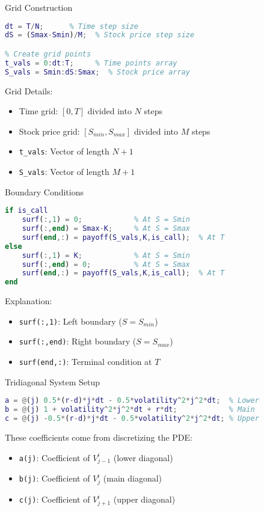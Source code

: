 \documentclass{beamer}
\begin{document}
\begin{frame}[fragile]{Grid Construction}
    \begin{lstlisting}[language=Matlab]
% Determine step sizes
dt = T/N;      % Time step size
dS = (Smax-Smin)/M;  % Stock price step size

% Create grid points
t_vals = 0:dt:T;     % Time points array
S_vals = Smin:dS:Smax;  % Stock price array
    \end{lstlisting}
    
    Grid Details:
    \begin{itemize}
        \item Time grid: $[0, T]$ divided into $N$ steps
        \item Stock price grid: $[S_{min}, S_{max}]$ divided into $M$ steps
        \item \texttt{t\_vals}: Vector of length $N+1$
        \item \texttt{S\_vals}: Vector of length $M+1$
    \end{itemize}
\end{frame}

\begin{frame}[fragile]{Boundary Conditions}
    \begin{lstlisting}[language=Matlab]
% Set boundary conditions
if is_call
    surf(:,1) = 0;            % At S = Smin
    surf(:,end) = Smax-K;     % At S = Smax
    surf(end,:) = payoff(S_vals,K,is_call);  % At T
else
    surf(:,1) = K;            % At S = Smin
    surf(:,end) = 0;          % At S = Smax
    surf(end,:) = payoff(S_vals,K,is_call);  % At T
end
    \end{lstlisting}
    
    Explanation:
    \begin{itemize}
        \item \texttt{surf(:,1)}: Left boundary ($S = S_{min}$)
        \item \texttt{surf(:,end)}: Right boundary ($S = S_{max}$)
        \item \texttt{surf(end,:)}: Terminal condition at $T$
    \end{itemize}
\end{frame}

\begin{frame}[fragile]{Tridiagonal System Setup}
    \begin{lstlisting}[language=Matlab]
% Define tridiagonal matrix coefficients
a = @(j) 0.5*(r-d)*j*dt - 0.5*volatility^2*j^2*dt;  % Lower
b = @(j) 1 + volatility^2*j^2*dt + r*dt;            % Main
c = @(j) -0.5*(r-d)*j*dt - 0.5*volatility^2*j^2*dt; % Upper
    \end{lstlisting}
    
    These coefficients come from discretizing the PDE:
    \begin{itemize}
        \item \texttt{a(j)}: Coefficient of $V_{j-1}^i$ (lower diagonal)
        \item \texttt{b(j)}: Coefficient of $V_j^i$ (main diagonal)
        \item \texttt{c(j)}: Coefficient of $V_{j+1}^i$ (upper diagonal)
    \end{itemize}
\end{frame}
\end{document}
